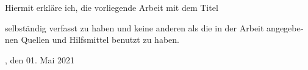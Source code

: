 \begin{otherlanguage}{ngerman} 
\begin{declaration}[Selbstständigkeitserklärung]

Hiermit erkläre ich, die vorliegende Arbeit mit dem Titel 

\begin{center}
	\makeatletter
	\textbf{\@title}
	
	\@germantitle
	\makeatother
\end{center}


selbständig verfasst zu haben und keine anderen als die in der Arbeit angegebenen Quellen und Hilfsmittel benutzt zu haben.

\vspace{15mm}
\flushright
\makeatletter
\@author{}

\@germanlocation, den 01.\@\xspace Mai 2021
\makeatother

\end{declaration}
\end{otherlanguage}  
